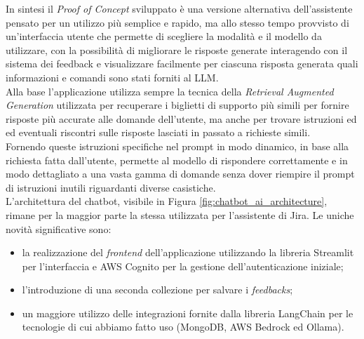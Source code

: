 In sintesi il \textit{Proof of Concept} sviluppato è una versione alternativa dell'assistente pensato per un utilizzo più semplice e rapido, ma allo stesso tempo 
provvisto di un'interfaccia utente che permette di scegliere la modalità e il modello da 
utilizzare, con la possibilità di migliorare le risposte generate interagendo con il 
sistema dei feedback e visualizzare facilmente per ciascuna risposta generata quali 
informazioni e comandi sono stati forniti al LLM.\\
Alla base l'applicazione utilizza sempre la tecnica della \textit{Retrieval Augmented 
Generation} utilizzata per recuperare i biglietti di supporto più simili per fornire risposte più accurate alle domande dell'utente, ma anche per trovare istruzioni ed ed 
eventuali riscontri sulle risposte lasciati in passato a richieste simili.\\
Fornendo queste istruzioni specifiche nel prompt in modo dinamico, in base alla richiesta fatta dall'utente, permette al modello di rispondere correttamente e in modo dettagliato a
una vasta gamma di domande senza dover riempire il prompt di istruzioni inutili 
riguardanti diverse casistiche.\\

L'architettura del chatbot, visibile in Figura \ref{fig:chatbot_ai_architecture}, rimane per la maggior parte la stessa utilizzata per l'assistente di Jira. 
Le uniche novità significative sono:
\begin{itemize}
    \item la realizzazione del \textit{frontend} dell'applicazione utilizzando la libreria Streamlit per l'interfaccia e AWS Cognito per la gestione dell'autenticazione iniziale;
    \item l'introduzione di una seconda collezione per salvare i \textit{feedbacks};
    \item un maggiore utilizzo delle integrazioni fornite dalla libreria LangChain per le tecnologie di cui abbiamo fatto uso (MongoDB, AWS Bedrock ed Ollama).
\end{itemize}

